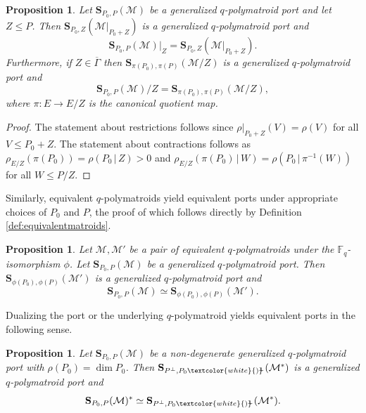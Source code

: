 \documentclass[onecolumn,draftclsnofoot,12pt]{IEEEtran}
\newcommand{\F}{\mathbb{F}}
\theoremstyle{plain} %
\newtheorem{proposition}[theorem]{Proposition}
\theoremstyle{definition}
\begin{document}
\begin{proposition}\label{prop:minors}
    Let $\mathbf{S}_{P_0,P}(\mathcal{M})$ be a generalized $q$-polymatroid port and let $Z\leq P$. Then $\mathbf{S}_{P_0,Z}(\mathcal{M}|_{P_0 + Z})$ is a generalized $q$-polymatroid port and
    $$\mathbf{S}_{P_0,P}(\mathcal{M})|_Z=\mathbf{S}_{P_0,Z}(\mathcal{M}|_{P_0 + Z}).$$
    Furthermore, if $Z\in \overline{\Gamma}$ then $\mathbf{S}_{\pi(P_0),\pi(P)}(\mathcal{M}/Z)$ is a generalized $q$-polymatroid port and
    $$\mathbf{S}_{P_0,P}(\mathcal{M})/Z = \mathbf{S}_{\pi(P_0),\pi(P)}(\mathcal{M}/Z),$$
    where $\pi\colon E\rightarrow E/Z$ is the canonical quotient map.
\end{proposition}
\begin{proof}
The statement about restrictions follows since $\rho|_{P_0+Z}(V) = \rho(V)$ for all $V\leq P_0+Z$. The statement about contractions follows as $\rho_{E/Z}(\pi(P_0)) = \rho(P_0 \,|\, Z) >0$ and $\rho_{E/Z}(\pi(P_0)\,|\, W) = \rho(P_0\,|\, \pi^{-1}(W))$ for all $W\leq P/Z$.
\end{proof}

Similarly, equivalent $q$-polymatroids yield equivalent ports under appropriate choices of $P_0$ and $P$, the proof of which follows directly by Definition \ref{def:equivalentmatroids}.

\begin{proposition} \label{prop:equivports}
    Let $\mathcal{M},\mathcal{M'}$ be a pair of equivalent $q$-polymatroids under the $\F_q$-isomorphism $\phi$.
    Let $\mathbf{S}_{P_0,P}(\mathcal{M})$ be a generalized $q$-polymatroid port. Then $\mathbf{S}_{\phi(P_0),\phi(P)}(\mathcal{M}')$ is a generalized $q$-polymatroid port and $$\mathbf{S}_{P_0,P}(\mathcal{M}) \simeq \mathbf{S}_{\phi(P_0),\phi(P)}(\mathcal{M}').$$
\end{proposition}

Dualizing the port or the underlying $q$-polymatroid yields equivalent ports in the following sense.

\begin{proposition}
    Let $\mathbf{S}_{P_0,P}(\mathcal{M})$ be a non-degenerate generalized $q$-polymatroid port with $\rho(P_0) = \dim P_0$. Then $\mathbf{S}_{P^{\perp},P_0\textcolor{white}{)}\hspace{-1.5mm}^{\perp}}(\mathcal{M}^*)$ is a generalized $q$-polymatroid port and
    \[
        \mathbf{S}_{P_0,P}(\mathcal{M})^* \simeq \mathbf{S}_{P^{\perp},P_0\textcolor{white}{)}\hspace{-1.5mm}^{\perp}}(\mathcal{M}^*).
    \]
\end{proposition}
\end{document}

